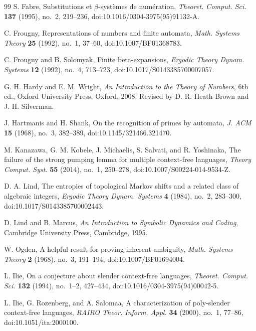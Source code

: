 \begin{thebibliography}{99}
S. Fabre,
Substitutions et \(\beta\)-syst\`emes de num\'eration,
\textit{Theoret. Comput. Sci.} \textbf{137} (1995), no.~2, 219--236,
doi:10.1016/0304-3975(95)91132-A.

C. Frougny,
Representations of numbers and finite automata,
\textit{Math. Systems Theory} \textbf{25} (1992), no.~1, 37--60,
doi:10.1007/BF01368783.

C. Frougny and B. Solomyak,
Finite beta-expansions,
\textit{Ergodic Theory Dynam. Systems} \textbf{12} (1992), no.~4,
713--723,
doi:10.1017/S0143385700007057.

G. H. Hardy and E. M. Wright,
\textit{An Introduction to the Theory of Numbers},
6th ed., Oxford University Press, Oxford, 2008.
Revised by D. R. Heath-Brown and J. H. Silverman.

J. Hartmanis and H. Shank,
On the recognition of primes by automata,
\textit{J. ACM} \textbf{15} (1968), no.~3, 382--389,
doi:10.1145/321466.321470.

M. Kanazawa, G. M. Kobele, J. Michaelis, S. Salvati, and R. Yoshinaka,
The failure of the strong pumping lemma for multiple context-free
languages,
\textit{Theory Comput. Syst.} \textbf{55} (2014), no.~1, 250--278,
doi:10.1007/S00224-014-9534-Z.

D. A. Lind,
The entropies of topological Markov shifts and a related class of algebraic
integers,
\textit{Ergodic Theory Dynam. Systems} \textbf{4} (1984), no.~2, 283--300,
doi:10.1017/S0143385700002443.

D. Lind and B. Marcus,
\textit{An Introduction to Symbolic Dynamics and Coding},
Cambridge University Press, Cambridge, 1995.

W. Ogden,
A helpful result for proving inherent ambiguity,
\textit{Math. Systems Theory} \textbf{2} (1968), no.~3, 191--194,
doi:10.1007/BF01694004.

L. Ilie,
On a conjecture about slender context-free languages,
\textit{Theoret. Comput. Sci.} \textbf{132} (1994), no.~1--2, 427--434,
doi:10.1016/0304-3975(94)00042-5.

L. Ilie, G. Rozenberg, and A. Salomaa,
A characterization of poly-slender context-free languages,
\textit{RAIRO Theor. Inform. Appl.} \textbf{34} (2000), no.~1,
77--86, doi:10.1051/ita:2000100.


\end{thebibliography}
